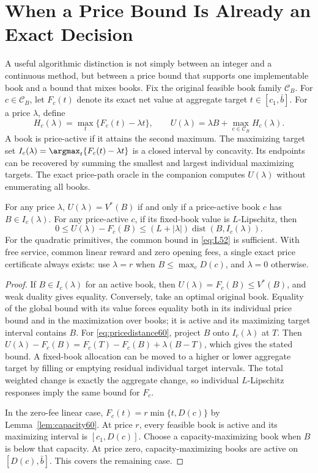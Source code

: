 \section{When a Price Bound Is Already an Exact Decision}\label{sec:pricebridge60}
A useful algorithmic distinction is not simply between an integer and a continuous method, but between a price bound that supports one implementable book and a bound that mixes books. Fix the original feasible book family $\mathcal C_B$. For $c\in\mathcal C_B$, let $F_c(t)$ denote its exact net value at aggregate target $t\in[c_1,\bar b]$. For a price $\lambda$, define
\[
 H_c(\lambda)=\max_t\{F_c(t)-\lambda t\},\qquad
 U(\lambda)=\lambda B+\max_{c\in\mathcal C_B}H_c(\lambda).
\]
A book is price-active if it attains the second maximum. The maximizing target set $I_c(\lambda)=\argmax_t\{F_c(t)-\lambda t\}$ is a closed interval by concavity. Its endpoints can be recovered by summing the smallest and largest individual maximizing targets. The exact price-path oracle in the companion computes $U(\lambda)$ without enumerating all books.

\begin{theorem}\label{thm:pricebridge60}
For any price $\lambda$, $U(\lambda)=V^*(B)$ if and only if a price-active book $c$ has $B\in I_c(\lambda)$. For any price-active $c$, if its fixed-book value is $L$-Lipschitz, then
\begin{equation}\label{eq:pricedistance60}
 0\leq U(\lambda)-F_c(B)
 \leq (L+|\lambda|)\operatorname{dist}(B,I_c(\lambda)).
\end{equation}
For the quadratic primitives, the common bound in \eqref{eq:L52} is sufficient. With free service, common linear reward and zero opening fees, a single exact price certificate always exists: use $\lambda=r$ when $B\leq\max_c D(c)$, and $\lambda=0$ otherwise.
\end{theorem}
\begin{proof}
If $B\in I_c(\lambda)$ for an active book, then $U(\lambda)=F_c(B)\leq V^*(B)$, and weak duality gives equality. Conversely, take an optimal original book. Equality of the global bound with its value forces equality both in its individual price bound and in the maximization over books; it is active and its maximizing target interval contains $B$. For \eqref{eq:pricedistance60}, project $B$ onto $I_c(\lambda)$ at $T$. Then
$U(\lambda)-F_c(B)=F_c(T)-F_c(B)+\lambda(B-T)$, which gives the stated bound. A fixed-book allocation can be moved to a higher or lower aggregate target by filling or emptying residual individual target intervals. The total weighted change is exactly the aggregate change, so individual $L$-Lipschitz responses imply the same bound for $F_c$.

In the zero-fee linear case, $F_c(t)=r\min\{t,D(c)\}$ by Lemma~\ref{lem:capacity60}. At price $r$, every feasible book is active and its maximizing interval is $[c_1,D(c)]$. Choose a capacity-maximizing book when $B$ is below that capacity. At price zero, capacity-maximizing books are active on $[D(c),\bar b]$. This covers the remaining case.
\end{proof}

